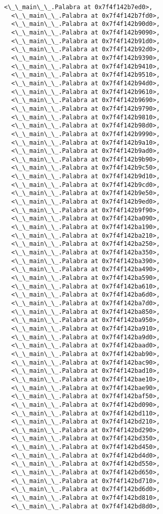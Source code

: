 \documentclass[12pt,a4paper,table]{article}
\begin{document}
\begin{tcolorbox}[breakable, size=fbox, boxrule=.5pt, pad at break*=1mm, opacityfill=0]
\begin{Verbatim}[commandchars=\\\{\}]
  <\_\_main\_\_.Palabra at 0x7f4f142b7ed0>,
  <\_\_main\_\_.Palabra at 0x7f4f142b7fd0>,
  <\_\_main\_\_.Palabra at 0x7f4f142b90d0>,
  <\_\_main\_\_.Palabra at 0x7f4f142b9090>,
  <\_\_main\_\_.Palabra at 0x7f4f142b91d0>,
  <\_\_main\_\_.Palabra at 0x7f4f142b92d0>,
  <\_\_main\_\_.Palabra at 0x7f4f142b9390>,
  <\_\_main\_\_.Palabra at 0x7f4f142b9410>,
  <\_\_main\_\_.Palabra at 0x7f4f142b9510>,
  <\_\_main\_\_.Palabra at 0x7f4f142b94d0>,
  <\_\_main\_\_.Palabra at 0x7f4f142b9610>,
  <\_\_main\_\_.Palabra at 0x7f4f142b9690>,
  <\_\_main\_\_.Palabra at 0x7f4f142b9790>,
  <\_\_main\_\_.Palabra at 0x7f4f142b9810>,
  <\_\_main\_\_.Palabra at 0x7f4f142b98d0>,
  <\_\_main\_\_.Palabra at 0x7f4f142b9990>,
  <\_\_main\_\_.Palabra at 0x7f4f142b9a10>,
  <\_\_main\_\_.Palabra at 0x7f4f142b9ad0>,
  <\_\_main\_\_.Palabra at 0x7f4f142b9b90>,
  <\_\_main\_\_.Palabra at 0x7f4f142b9c50>,
  <\_\_main\_\_.Palabra at 0x7f4f142b9d10>,
  <\_\_main\_\_.Palabra at 0x7f4f142b9cd0>,
  <\_\_main\_\_.Palabra at 0x7f4f142b9e50>,
  <\_\_main\_\_.Palabra at 0x7f4f142b9ed0>,
  <\_\_main\_\_.Palabra at 0x7f4f142b9f90>,
  <\_\_main\_\_.Palabra at 0x7f4f142ba090>,
  <\_\_main\_\_.Palabra at 0x7f4f142ba190>,
  <\_\_main\_\_.Palabra at 0x7f4f142ba210>,
  <\_\_main\_\_.Palabra at 0x7f4f142ba250>,
  <\_\_main\_\_.Palabra at 0x7f4f142ba350>,
  <\_\_main\_\_.Palabra at 0x7f4f142ba390>,
  <\_\_main\_\_.Palabra at 0x7f4f142ba490>,
  <\_\_main\_\_.Palabra at 0x7f4f142ba590>,
  <\_\_main\_\_.Palabra at 0x7f4f142ba610>,
  <\_\_main\_\_.Palabra at 0x7f4f142ba6d0>,
  <\_\_main\_\_.Palabra at 0x7f4f142ba7d0>,
  <\_\_main\_\_.Palabra at 0x7f4f142ba850>,
  <\_\_main\_\_.Palabra at 0x7f4f142ba950>,
  <\_\_main\_\_.Palabra at 0x7f4f142ba910>,
  <\_\_main\_\_.Palabra at 0x7f4f142ba9d0>,
  <\_\_main\_\_.Palabra at 0x7f4f142baad0>,
  <\_\_main\_\_.Palabra at 0x7f4f142bab90>,
  <\_\_main\_\_.Palabra at 0x7f4f142bac90>,
  <\_\_main\_\_.Palabra at 0x7f4f142bad10>,
  <\_\_main\_\_.Palabra at 0x7f4f142bae10>,
  <\_\_main\_\_.Palabra at 0x7f4f142bae90>,
  <\_\_main\_\_.Palabra at 0x7f4f142baf50>,
  <\_\_main\_\_.Palabra at 0x7f4f142bd090>,
  <\_\_main\_\_.Palabra at 0x7f4f142bd110>,
  <\_\_main\_\_.Palabra at 0x7f4f142bd210>,
  <\_\_main\_\_.Palabra at 0x7f4f142bd290>,
  <\_\_main\_\_.Palabra at 0x7f4f142bd350>,
  <\_\_main\_\_.Palabra at 0x7f4f142bd450>,
  <\_\_main\_\_.Palabra at 0x7f4f142bd4d0>,
  <\_\_main\_\_.Palabra at 0x7f4f142bd550>,
  <\_\_main\_\_.Palabra at 0x7f4f142bd650>,
  <\_\_main\_\_.Palabra at 0x7f4f142bd710>,
  <\_\_main\_\_.Palabra at 0x7f4f142bd6d0>,
  <\_\_main\_\_.Palabra at 0x7f4f142bd810>,
  <\_\_main\_\_.Palabra at 0x7f4f142bd8d0>,

\end{Verbatim}
\end{tcolorbox}
\end{document}

